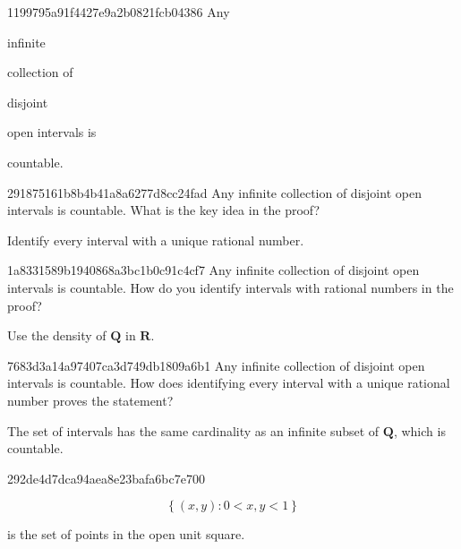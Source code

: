 \begin{note}{1199795a91f4427e9a2b0821fcb04386}
    Any \begin{icloze}{3}infinite\end{icloze} collection of \begin{icloze}{2}disjoint\end{icloze} open intervals is \begin{icloze}{1}countable.\end{icloze}
\end{note}

\begin{note}{291875161b8b4b41a8a6277d8cc24fad}
    Any infinite collection of disjoint open intervals is countable.
    What is the key idea in the proof?

    \begin{cloze}{1}
        Identify every interval with a unique rational number.
    \end{cloze}
\end{note}

\begin{note}{1a8331589b1940868a3bc1b0c91c4cf7}
    Any infinite collection of disjoint open intervals is countable.
    How do you identify intervals with rational numbers in the proof?

    \begin{cloze}{1}
        Use the density of \({ \mathbf{Q} }\) in \({ \mathbf{R} }\).
    \end{cloze}
\end{note}

\begin{note}{7683d3a14a97407ca3d749db1809a6b1}
    Any infinite collection of disjoint open intervals is countable.
    How does identifying every interval with a unique rational number proves the statement?

    \begin{cloze}{1}
        The set of intervals has the same cardinality as an infinite subset of \({ \mathbf{Q} }\), which is countable.
    \end{cloze}
\end{note}

\begin{note}{292de4d7dca94aea8e23bafa6bc7e700}
    \begin{icloze}{1}
        \[
            \left\{ (x, y) : 0 < x, y < 1 \right\}
        \]
    \end{icloze}
    is the set of points in the open unit square.
\end{note}

